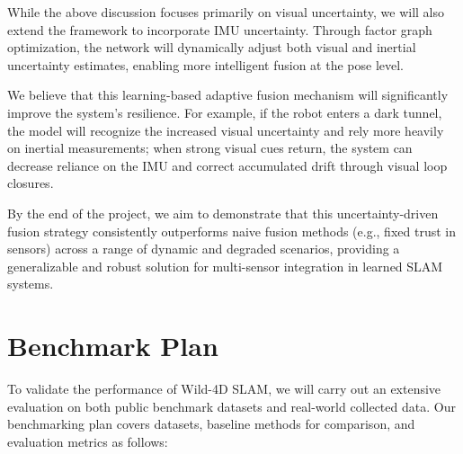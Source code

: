 While the above discussion focuses primarily on visual uncertainty, we will also extend the framework to incorporate IMU uncertainty. Through factor graph optimization, the network will dynamically adjust both visual and inertial uncertainty estimates, enabling more intelligent fusion at the pose level.

We believe that this learning-based adaptive fusion mechanism will significantly improve the system's resilience. For example, if the robot enters a dark tunnel, the model will recognize the increased visual uncertainty and rely more heavily on inertial measurements; when strong visual cues return, the system can decrease reliance on the IMU and correct accumulated drift through visual loop closures.

By the end of the project, we aim to demonstrate that this uncertainty-driven fusion strategy consistently outperforms naive fusion methods (e.g., fixed trust in sensors) across a range of dynamic and degraded scenarios, providing a generalizable and robust solution for multi-sensor integration in learned SLAM systems.





\section{Benchmark Plan}

To validate the performance of Wild-4D SLAM, we will carry out an extensive evaluation on both public benchmark datasets and real-world collected data. Our benchmarking plan covers datasets, baseline methods for comparison, and evaluation metrics as follows:

